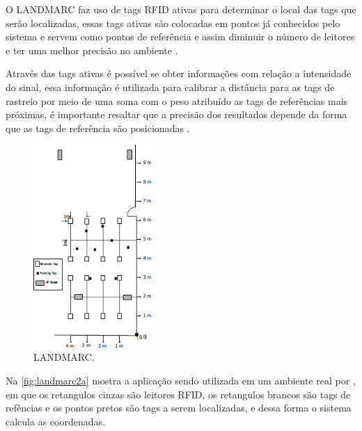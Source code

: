    \par
    O LANDMARC faz uso de tags RFID ativas para determinar o local das tags que serão localizadas, essas tags ativas são colocadas em pontos já conhecidos pelo sistema e servem como pontos de referência e assim diminuir o número de leitores e ter uma melhor precisão no ambiente \cite{RFIDapplicationsTechniques}.
    
    \par
    Através das tags ativas é possível se obter informações com relação a intensidade do sinal, essa informação é utilizada para calibrar a distância para as tags de rastreio por meio de uma soma com o peso atribuído as tags de referências mais próximas, é importante resaltar que a precisão dos resultados depende da forma que as tags de referência são posicionadas \cite{RFIDapplicationsTechniques}.
    
    \begin{figure}[H]
              \caption{\label{fig:landmarc2a}{LANDMARC.}}
              \centering
              \includegraphics[width=0.4\textwidth]{Figuras/landmarc2a.png}
        \end{figure}
    \par
    Na \autoref{fig:landmarc2a} mostra a aplicação sendo utilizada em um ambiente real por \citeauthor{landmarc}, em que os retangulos cinzas são leitores RFID, os retangulos brancos são tags de refências e os pontos pretos são tags a serem localizadas, e dessa forma o sistema calcula as coordenadas.


